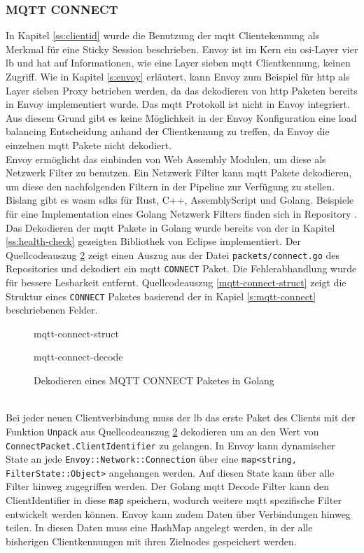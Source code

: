 \subsubsection{MQTT CONNECT}
In Kapitel \ref{ss:clientid} wurde die Benutzung der \ac{mqtt} Clientekennung als Merkmal für eine Sticky Session beschrieben. Envoy ist im Kern ein \ac{osi}-Layer vier \acl{lb} und hat auf Informationen, wie eine Layer sieben \ac{mqtt} Clientkennung, keinen Zugriff. Wie in Kapitel \ref{s:envoy} erläutert, kann Envoy zum Beispiel für \ac{http} als Layer sieben Proxy betrieben werden, da das dekodieren von \ac{http} Paketen bereits in Envoy implementiert wurde.
Das \ac{mqtt} Protokoll ist nicht in Envoy integriert. Aus diesem Grund gibt es keine Möglichkeit in der Envoy Konfiguration eine load balancing Entscheidung anhand der Clientkennung zu treffen, da Envoy die einzelnen \ac{mqtt} Pakete nicht dekodiert.
\\
Envoy ermöglicht das einbinden von Web Assembly Modulen, um diese als Netzwerk Filter zu benutzen. Ein Netzwerk Filter kann \ac{mqtt} Pakete dekodieren, um diese den nachfolgenden Filtern in der Pipeline zur Verfügung zu stellen. Bislang gibt es \ac{wasm} \acp{sdk} für Rust, C++, AssemblyScript und Golang. \cite{sebastianHowWriteWASM} Beispiele für eine Implementation eines Golang Netzwerk Filters finden sich in Repository \cite{TetratelabsProxywasmgosdk2021}.
\\
Das Dekodieren der \ac{mqtt} Pakete in Golang wurde bereits von der in Kapitel \ref{ss:health-check} gezeigten Bibliothek von Eclipse implementiert.
Der Quellcodeauszug \ref{code:mqtt-connect-decode} zeigt einen Auszug aus der Datei \verb|packets/connect.go| des Repositories und dekodiert ein \ac{mqtt} \verb|CONNECT| Paket. Die Fehlerabhandlung wurde für bessere Lesbarkeit entfernt. Quellcodeauszug \ref{mqtt-connect-struct} zeigt die Struktur eines \verb|CONNECT| Paketes basierend der in Kapiel \ref{s:mqtt-connect} beschriebenen Felder.
\begin{figure}
    {mqtt-connect-struct}
    \caption{}
    \label{code:mqtt-connect-struct}
\end{figure}
\begin{figure}
    {mqtt-connect-decode}
    \caption{Dekodieren eines MQTT CONNECT Paketes in Golang \cite{EclipsePahoMqtt2021}}
    \label{code:mqtt-connect-decode}
\end{figure}
\\
Bei jeder neuen Clientverbindung muss der \acl{lb} das erste Paket des Clients mit der Funktion \verb|Unpack| aus Quellcodeauszug \ref{code:mqtt-connect-decode} dekodieren um an den Wert von \verb|ConnectPacket.ClientIdentifier| zu gelangen. In Envoy kann dynamischer State an jede \verb|Envoy::Network::Connection| über eine \verb|map<string, FilterState::Object>| angehangen werden. Auf diesen State kann über alle Filter hinweg zugegriffen werden. Der Golang \ac{mqtt} Decode Filter kann den ClientIdentifier in diese \verb|map| speichern, wodurch weitere \ac{mqtt} spezifische Filter entwickelt werden können.
Envoy kann zudem Daten über Verbindungen hinweg teilen. In diesen Daten muss eine HashMap angelegt werden, in der alle bisherigen Clientkennungen mit ihren Zielnodes gespeichert werden.\cite{SharingDataFilters}

